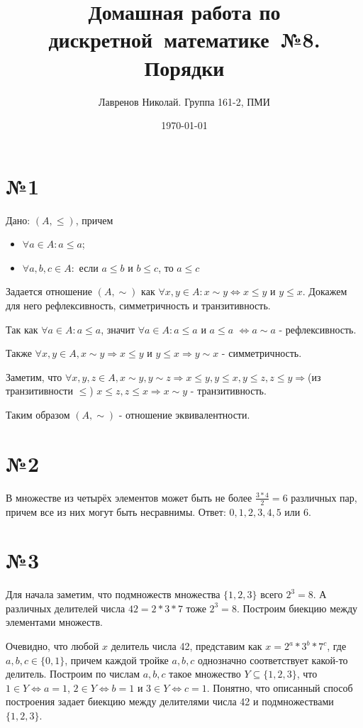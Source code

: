 \documentclass[12pt]{article}
\title{Домашная работа по дискретной~математике~№8.\\Порядки}
\date{\today}
\author{Лавренов Николай. Группа 161-2, ПМИ}
\begin{document}
	\maketitle
	\newpage
	\section*{№1}
	Дано: $(A, \leqslant )$, причем 
	\begin{itemize}	
	\item $\forall a \in A: a \leqslant a$;
	\item $\forall a, b, c \in A: $ если $a \leqslant b $ и $b \leqslant c$, то $a \leqslant c$
	\end{itemize}
Задается отношение $(A, \sim)$ как $\forall x, y \in A: x \sim y \Leftrightarrow
	x \leqslant y$ и $y \leqslant x$. Докажем для него рефлексивность, симметричность и транзитивность.
	
	Так как $\forall a \in A: a \leqslant a$, значит $\forall a \in A: a \leqslant a$ и $a \leqslant a$
	$\Leftrightarrow a \sim a$ - рефлексивность.
	
	Также $\forall x, y \in A, x \sim y \Rightarrow x \leqslant y$ и $y \leqslant x \Rightarrow
	y \sim x$ - симметричность.
	
	Заметим, что $\forall x, y, z \in A, x \sim y, y \sim z \Rightarrow
	x \leqslant y, y \leqslant x, y \leqslant z, z \leqslant y \Rightarrow $(из транзитивности $\leqslant$)
	$ x \leqslant z, z \leqslant x \Rightarrow x \sim y$ - транзитивность.
	
	Таким образом  $(A, \sim)$ - отношение эквивалентности.
	\section*{№2}
	В множестве из четырёх элементов может быть не более $\frac{3*4}{2}=6$ различных пар, причем все из них могут быть несравнимы. Ответ: $0, 1, 2, 3, 4, 5$ или $6$.
	\section*{№3}
	Для начала заметим, что подмножеств множества $\{1, 2, 3\}$ всего $2^3=8$. А различных делителей числа $42=2*3*7$ тоже $2^3=8$. Построим биекцию между элементами множеств.
	
	Очевидно, что любой $x$ делитель числа 42, представим как $x=2^a*3^b*7^c$, где $a, b, c \in \{0, 1\}$, причем каждой тройке $a, b, c$ однозначно соответствует какой-то делитель. Построим по числам $a, b, c$ такое множество $Y \subseteq \{1, 2, 3\}$, что $1 \in Y \Leftrightarrow a = 1$, $2 \in Y \Leftrightarrow b = 1$ и $3 \in Y \Leftrightarrow c = 1$. Понятно, что описанный способ построения задает биекцию между делителями числа 42 и подмножествами $\{1, 2, 3\}$.
	
\end{document}

